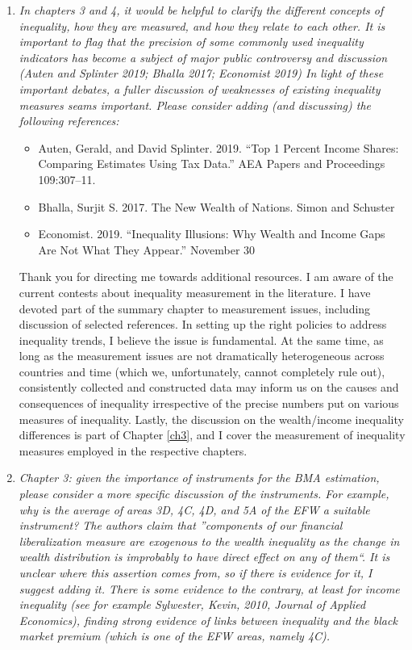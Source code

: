 \begin{enumerate}
    \item \textit{In chapters 3 and 4, it would be helpful to clarify the different concepts of inequality, how they are measured, and how they relate to each other. It is important to flag that the precision of some commonly used inequality indicators has become a subject of major public controversy and discussion (Auten and Splinter 2019; Bhalla 2017; Economist 2019) In light of these important debates, a fuller discussion of weaknesses of existing inequality measures seams important. Please consider adding (and discussing) the following references:}
     \begin{itemize}
        \item Auten, Gerald, and David Splinter. 2019. ``Top 1 Percent Income Shares: Comparing Estimates Using Tax Data.'' AEA Papers and Proceedings 109:307–11.
        \item Bhalla, Surjit S. 2017. The New Wealth of Nations. Simon and Schuster
        \item Economist. 2019. ``Inequality Illusions: Why Wealth and Income Gaps Are Not What They Appear.'' November 30
      \end{itemize}
    
      Thank you for directing me towards additional resources. I am aware of the current contests about inequality measurement in the literature. I have devoted part of the summary chapter to measurement issues, including discussion of selected references. In setting up the right policies to address inequality trends, I believe the issue is fundamental. At the same time, as long as the measurement issues are not dramatically heterogeneous across countries and time (which we, unfortunately, cannot completely rule out), consistently collected and constructed data may inform us on the causes and consequences of inequality irrespective of the precise numbers put on various measures of inequality. Lastly, the discussion on the wealth/income inequality differences is part of Chapter \ref{ch3}, and I cover the measurement of inequality measures employed in the respective chapters. 

    \item \textit{Chapter 3: given the importance of instruments for the BMA estimation, please consider a more specific discussion of the instruments. For example, why is the average of areas 3D, 4C, 4D, and 5A of the EFW a suitable instrument? The authors claim that ''components of our financial liberalization measure are exogenous to the wealth inequality as the change in wealth distribution is improbably to have direct effect on any of them``. It is unclear where this assertion comes from, so if there is evidence for it, I suggest adding it. There is some evidence to the contrary, at least for income inequality (see for example Sylwester, Kevin, 2010, Journal of Applied Economics), finding strong evidence of links between inequality and the black market premium (which is one of the EFW areas, namely 4C).}
    

\end{enumerate}
